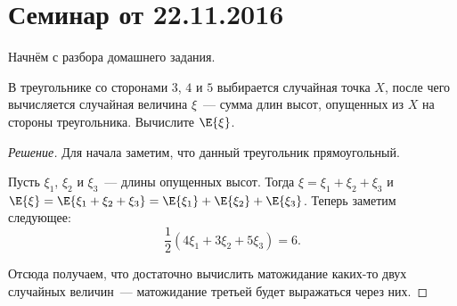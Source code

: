 \section{Семинар от 22.11.2016}
Начнём с разбора домашнего задания.
\begin{problem}
	В треугольнике со сторонами \(3\), \(4\) и \(5\) выбирается случайная точка \(X\), после чего вычисляется случайная величина \(\xi\)~--- сумма длин высот, опущенных из \(X\) на стороны треугольника. Вычислите \(\E{\xi}\).
\end{problem}
\begin{proof}[Решение]
	Для начала заметим, что данный треугольник прямоугольный.
	
	{\makeatletter
	\let\par\@@par
	\par{}
	\everypar{}\begin{wrapfigure}{r}{0.4\textwidth}
		\begin{center}
		\end{center}
	\end{wrapfigure}
	Пусть \(\xi_1\), \(\xi_2\) и \(\xi_3\)~--- длины опущенных высот. Тогда \(\xi = \xi_1 + \xi_2 + \xi_3\) и \(\E{\xi} = \E{\xi_1 + \xi_2 + \xi_3} = \E{\xi_1} + \E{\xi_2} + \E{\xi_3}\). Теперь заметим следующее:
	\[\frac{1}{2}\left(4\xi_1 + 3\xi_2 + 5\xi_3\right) = 6.\]
	
	Отсюда получаем, что достаточно вычислить матожидание каких-то двух случайных величин~--- матожидание третьей будет выражаться через них.
	
}
\end{proof}
